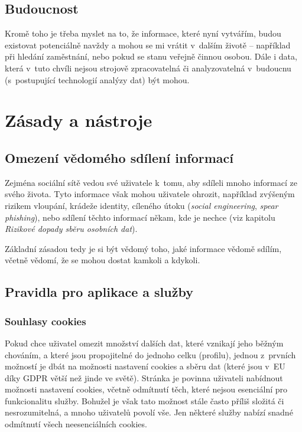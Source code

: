 \subsection{Budoucnost}
Kromě toho je třeba myslet na to, že informace, které nyní vytvářím, budou existovat potenciálně navždy a mohou se mi vrátit v~dalším životě -- například při hledání zaměstnání, nebo pokud se stanu veřejně činnou osobou. 
Dále i data, která v~tuto chvíli nejsou strojově zpracovatelná či analyzovatelná v~budoucnu (s~postupující technologií analýzy dat) být mohou.


\section{Zásady a nástroje}

\subsection{Omezení vědomého sdílení informací}
Zejména sociální sítě vedou své uživatele k~tomu, aby sdíleli mnoho informací ze svého života. Tyto informace však mohou uživatele ohrozit, například zvýšeným rizikem vloupání, krádeže identity, cíleného útoku (\textit{social engineering}, \textit{spear phishing}), nebo sdílení těchto informací někam, kde je nechce (viz kapitolu \textit{Rizikové dopady sběru osobních dat}).

Základní zásadou tedy je si být vědomý toho, jaké informace vědomě sdílím, včetně vědomí, že se mohou dostat kamkoli a kdykoli.

\subsection{Pravidla pro aplikace a služby}
\subsubsection*{Souhlasy cookies}

Pokud chce uživatel omezit množství dalších dat, které vznikají jeho běžným chováním, a které jsou propojitelné do jednoho celku (profilu), jednou z~prvních možností je dbát na možnosti nastavení cookies a sběru dat (které jsou v~EU díky GDPR větší než jinde ve světě). Stránka je povinna uživateli nabídnout možnosti nastavení cookies, včetně odmítnutí těch, které nejsou esenciální pro funkcionalitu služby.
Bohužel je však tato možnost stále často příliš složitá či nesrozumitelná, a mnoho uživatelů povolí vše. Jen některé služby nabízí snadné odmítnutí všech neesenciálních cookies.\\

